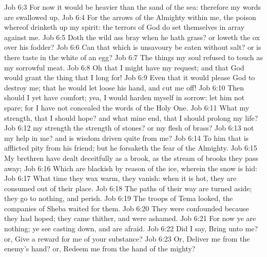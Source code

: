 \vs Job 6:3 For now it would be heavier than the sand of the sea: therefore my words are swallowed up.
\vs Job 6:4 For the arrows of the Almighty  within me, the poison whereof drinketh up my spirit: the terrors of God do set themselves in array against me.
\vs Job 6:5 Doth the wild ass bray when he hath grass? or loweth the ox over his fodder?
\vs Job 6:6 Can that which is unsavoury be eaten without salt? or is there  taste in the white of an egg?
\vs Job 6:7 The things  my soul refused to touch  as my sorrowful meat.
\vs Job 6:8 Oh that I might have my request; and that God would grant  the thing that I long for!
\vs Job 6:9 Even that it would please God to destroy me; that he would let loose his hand, and cut me off!
\vs Job 6:10 Then should I yet have comfort; yea, I would harden myself in sorrow: let him not spare; for I have not concealed the words of the Holy One.
\vs Job 6:11 What  my strength, that I should hope? and what  mine end, that I should prolong my life?
\vs Job 6:12  my strength the strength of stones? or  my flesh of brass?
\vs Job 6:13  not my help in me? and is wisdom driven quite from me?
\vs Job 6:14 To him that is afflicted pity  from his friend; but he forsaketh the fear of the Almighty.
\vs Job 6:15 My brethren have dealt deceitfully as a brook,  as the stream of brooks they pass away;
\vs Job 6:16 Which are blackish by reason of the ice,  wherein the snow is hid:
\vs Job 6:17 What time they wax warm, they vanish: when it is hot, they are consumed out of their place.
\vs Job 6:18 The paths of their way are turned aside; they go to nothing, and perish.
\vs Job 6:19 The troops of Tema looked, the companies of Sheba waited for them.
\vs Job 6:20 They were confounded because they had hoped; they came thither, and were ashamed.
\vs Job 6:21 For now ye are nothing; ye see  casting down, and are afraid.
\vs Job 6:22 Did I say, Bring unto me? or, Give a reward for me of your substance?
\vs Job 6:23 Or, Deliver me from the enemy's hand? or, Redeem me from the hand of the mighty?
